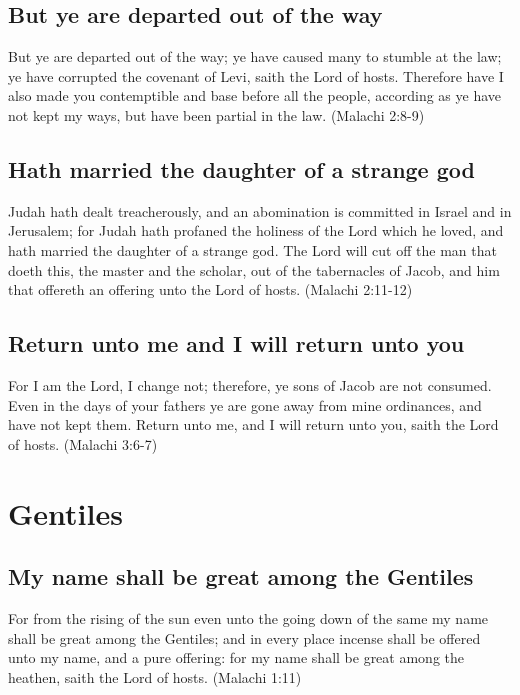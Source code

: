 \subsection{But ye are departed out of the way}
But ye are departed out of the way; ye have caused many to stumble at the law; ye have corrupted the covenant of Levi, saith the Lord of hosts. Therefore have I also made you contemptible and base before all the people, according as ye have not kept my ways, but have been partial in the law. (Malachi 2:8-9)

\subsection{Hath married the daughter of a strange god}
Judah hath dealt treacherously, and an abomination is committed in Israel and in Jerusalem; for Judah hath profaned the holiness of the Lord which he loved, and hath married the daughter of a strange god. The Lord will cut off the man that doeth this, the master and the scholar, out of the tabernacles of Jacob, and him that offereth an offering unto the Lord of hosts. (Malachi 2:11-12)

\subsection{Return unto me and I will return unto you}
For I am the Lord, I change not; therefore, ye sons of Jacob are not consumed. Even in the days of your fathers ye are gone away from mine ordinances, and have not kept them. Return unto me, and I will return unto you, saith the Lord of hosts. (Malachi 3:6-7)

\section{Gentiles}

\subsection{My name shall be great among the Gentiles}
For from the rising of the sun even unto the going down of the same my name shall be great among the Gentiles; and in every place incense shall be offered unto my name, and a pure offering: for my name shall be great among the heathen, saith the Lord of hosts. (Malachi 1:11)
